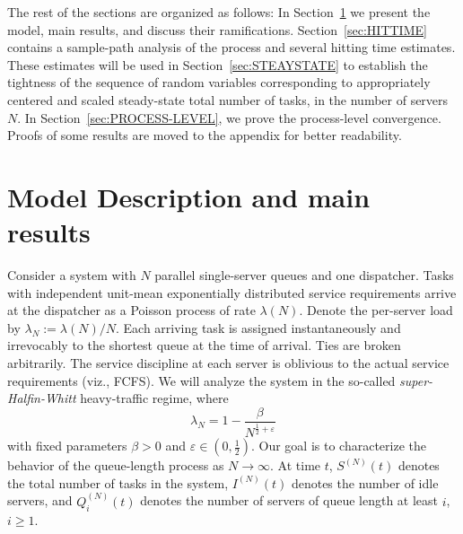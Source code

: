 \documentclass[11pt, reqno]{article}
\numberwithin{equation}{section}
\numberwithin{theorem}{section}
\begin{document}
The rest of the sections are organized as follows: 
In Section~\ref{sec:MAIN} we present the model, main results, and discuss their ramifications.
Section~\ref{sec:HITTIME} contains a sample-path analysis of the process and several hitting time estimates. 
These estimates will be used in Section~\ref{sec:STEAYSTATE} to establish the tightness of the sequence of random variables corresponding to appropriately centered and scaled steady-state total number of tasks, in the number of servers $N$. In Section~\ref{sec:PROCESS-LEVEL}, we prove the process-level convergence.
Proofs of some results 
are moved to the appendix for better readability.

\section{Model Description and main results}\label{sec:MAIN}
Consider a system with $N$ parallel single-server queues and one dispatcher. 
Tasks with independent unit-mean exponentially distributed service requirements arrive at the dispatcher as a Poisson process of rate $\lambda(N)$. 
Denote the per-server load by $\lambda_N:= \lambda(N)/N$.
Each arriving task is assigned instantaneously and irrevocably to the shortest queue at the time of arrival. Ties are broken arbitrarily.
The service discipline at each server is oblivious to the actual service requirements (viz., FCFS).
We will analyze the system in the so-called \emph{super-Halfin-Whitt} heavy-traffic regime, where 
\begin{equation}\label{eq:SHW-def}
    \lambda_N=1-\frac{\beta}{N^{\frac{1}{2}+\varepsilon}}
\end{equation}
with fixed parameters $\beta>0$ and $\varepsilon\in(0,\frac{1}{2})$. 
Our goal is to characterize the behavior of the queue-length process as $N\to \infty$.
At time $t$,  $S^{(N)}(t)$ denotes the total number of tasks in the system, $I^{(N)}(t)$ denotes the number of idle servers, and $Q^{(N)}_i(t)$ denotes the number of servers of queue length at least $i$, $i\geq 1$.
\end{document}
